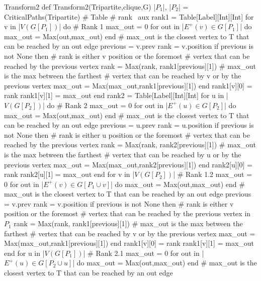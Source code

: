 
\begin{code}{Transform2}
def Transform2(Tripartite,clique,G)
  |$P_1$|, |$P_2$| = CriticalPaths(Tripartite)
  # Table
  # rank \ aux
  rank1 = Table[Label][Int][Int]
  for v in |$V(G[P_1])$| do # Rank 1
    max_out = 0
    for out in |$E^+(v) \in G[P_1]$| do
      max_out = Max(out,max_out)
    end # max_out is the closest vertex to T that can be reached by an out edge
    previous = v.prev
    rank = v.position
    if previous is not None then
      # rank is either v position or the foremost 
      # vertex that can be reached by the previous vertex
      rank = Max(rank, rank1[previous][1]) 
      # max_out is the max between the farthest
      # vertex that can be reached by v or by the previous vertex
      max_out = Max(max_out,rank1[previous][1])  
    end
    rank1[v][0] = rank
    rank1[v][1] = max_out
  end
  rank2 = Table[Label][Int][Int]
  for u in |$V(G[P_2])$| do # Rank 2
    max_out = 0
    for out in |$E^+(u) \in G[P_2]$| do
      max_out = Max(out,max_out)
    end # max_out is the closest vertex to T that can be reached by an out edge
    previous = u.prev
    rank = u.position
    if previous is not None then
      # rank is either u position or the foremost 
      # vertex that can be reached by the previous vertex
      rank = Max(rank, rank2[previous][1]) 
      # max_out is the max between the farthest
      # vertex that can be reached by u or by the previous vertex 
      max_out = Max(max_out,rank2[previous][1]) 
    end
    rank2[u][0] = rank
    rank2[u][1] = max_out
  end
  for v in |$V(G[P_2])$| # Rank 1.2
    max_out = 0
    for out in |$E^+(v) \in G[P_1 \cup v]$| do
      max_out = Max(out,max_out)
    end # max_out is the closest vertex to T that can be reached by an out edge
    previous = v.prev
    rank = v.position
    if previous is not None then
      # rank is either v position or the foremost 
      # vertex that can be reached by the previous vertex in $P_1$
      rank = Max(rank, rank1[previous][1]) 
      # max_out is the max between the farthest
      # vertex that can be reached by v or by the previous vertex
      max_out = Max(max_out,rank1[previous][1])  
    end
    rank1[v][0] = rank
    rank1[v][1] = max_out
  end
  for u in |$V(G[P_1])$| # Rank 2.1
    max_out = 0
    for out in |$E^+(u) \in G[P_2 \cup u]$| do
      max_out = Max(out,max_out)
    end # max_out is the closest vertex to T that can be reached by an out edge

\end{code}
